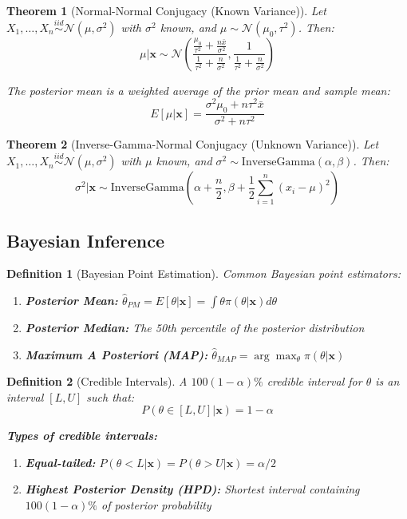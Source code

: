 \documentclass[12pt,a4paper]{article}
\newtheorem{theorem}{Theorem}[section]
\newtheorem{definition}{Definition}[section]
\theoremstyle{remark}
\begin{document}
\begin{theorem}[Normal-Normal Conjugacy (Known Variance)]
Let $X_1, \ldots, X_n \stackrel{iid}{\sim} \mathcal{N}(\mu, \sigma^2)$ with $\sigma^2$ known, and $\mu \sim \mathcal{N}(\mu_0, \tau^2)$. Then:
$$\mu | \mathbf{x} \sim \mathcal{N}\left(\frac{\frac{\mu_0}{\tau^2} + \frac{n\bar{x}}{\sigma^2}}{\frac{1}{\tau^2} + \frac{n}{\sigma^2}}, \frac{1}{\frac{1}{\tau^2} + \frac{n}{\sigma^2}}\right)$$

The posterior mean is a weighted average of the prior mean and sample mean:
$$E[\mu | \mathbf{x}] = \frac{\sigma^2\mu_0 + n\tau^2\bar{x}}{\sigma^2 + n\tau^2}$$
\end{theorem}

\begin{theorem}[Inverse-Gamma-Normal Conjugacy (Unknown Variance)]
Let $X_1, \ldots, X_n \stackrel{iid}{\sim} \mathcal{N}(\mu, \sigma^2)$ with $\mu$ known, and $\sigma^2 \sim \text{InverseGamma}(\alpha, \beta)$. Then:
$$\sigma^2 | \mathbf{x} \sim \text{InverseGamma}\left(\alpha + \frac{n}{2}, \beta + \frac{1}{2}\sum_{i=1}^n(x_i - \mu)^2\right)$$
\end{theorem}

\subsection{Bayesian Inference}

\begin{definition}[Bayesian Point Estimation]
Common Bayesian point estimators:
\begin{enumerate}
\item \textbf{Posterior Mean:} $\hat{\theta}_{PM} = E[\theta | \mathbf{x}] = \int \theta \pi(\theta | \mathbf{x}) d\theta$
\item \textbf{Posterior Median:} The 50th percentile of the posterior distribution
\item \textbf{Maximum A Posteriori (MAP):} $\hat{\theta}_{MAP} = \arg\max_\theta \pi(\theta | \mathbf{x})$
\end{enumerate}
\end{definition}

\begin{definition}[Credible Intervals]
A $100(1-\alpha)\%$ credible interval for $\theta$ is an interval $[L, U]$ such that:
$$P(\theta \in [L, U] | \mathbf{x}) = 1 - \alpha$$

\textbf{Types of credible intervals:}
\begin{enumerate}
\item \textbf{Equal-tailed:} $P(\theta < L | \mathbf{x}) = P(\theta > U | \mathbf{x}) = \alpha/2$
\item \textbf{Highest Posterior Density (HPD):} Shortest interval containing $100(1-\alpha)\%$ of posterior probability
\end{enumerate}
\end{definition}
\end{document}
